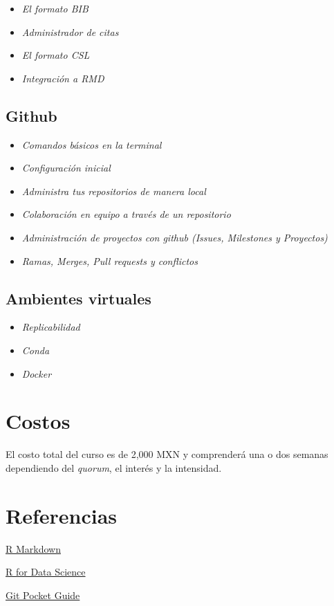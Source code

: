 \documentclass[11pt,]{article}
\begin{document}
\begin{itemize}
\item
  \emph{El formato BIB}
\item
  \emph{Administrador de citas}
\item
  \emph{El formato CSL}
\item
  \emph{Integración a RMD}
\end{itemize}

\hypertarget{github}{%
\subsection{Github}\label{github}}

\begin{itemize}
\item
  \emph{Comandos básicos en la terminal}
\item
  \emph{Configuración inicial}
\item
  \emph{Administra tus repositorios de manera local}
\item
  \emph{Colaboración en equipo a través de un repositorio}
\item
  \emph{Administración de proyectos con github (Issues, Milestones y
  Proyectos)}
\item
  \emph{Ramas, Merges, Pull requests y conflictos}
\end{itemize}

\hypertarget{ambientes-virtuales}{%
\subsection{Ambientes virtuales}\label{ambientes-virtuales}}

\begin{itemize}
\item
  \emph{Replicabilidad}
\item
  \emph{Conda}
\item
  \emph{Docker}
\end{itemize}

\hypertarget{costos}{%
\section{Costos}\label{costos}}

El costo total del curso es de 2,000 MXN y comprenderá una o dos semanas
dependiendo del \emph{quorum}, el interés y la intensidad.

\hypertarget{referencias}{%
\section{Referencias}\label{referencias}}

\href{https://bookdown.org/yihui/rmarkdown/}{R Markdown}

\href{https://r4ds.had.co.nz/index.html}{R for Data Science}

\href{https://github.com/miollek/Free-Git-Books/blob/master/book/Git\%20Pocket\%20Guide\%20-\%20A\%20Working\%20Introduction.pdf}{Git
Pocket Guide}

\newpage
\end{document}
